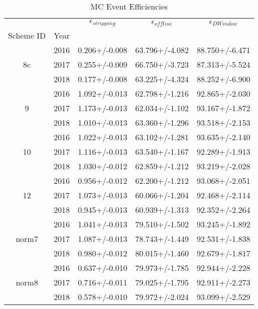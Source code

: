 \begin{table}
\centering
\caption{MC Event Efficiencies}
\label{tab:event_offdwin_2}
\begin{tabular}{ccccc}
\toprule
      &      & $\epsilon_{stripping}$ & $\epsilon_{offline}$ & $\epsilon_{D Window}$ \\
Scheme ID & Year &                        &                      &                       \\
\midrule
\multirow{3}{*}{8c} & 2016 &          0.206+/-0.008 &       63.796+/-4.082 &        88.750+/-6.471 \\
      & 2017 &          0.255+/-0.009 &       66.750+/-3.723 &        87.313+/-5.524 \\
      & 2018 &          0.177+/-0.008 &       63.225+/-4.324 &        88.252+/-6.900 \\
\cline{1-5}
\multirow{3}{*}{9} & 2016 &          1.092+/-0.013 &       62.798+/-1.216 &        92.865+/-2.030 \\
      & 2017 &          1.173+/-0.013 &       62.034+/-1.102 &        93.167+/-1.872 \\
      & 2018 &          1.010+/-0.013 &       63.360+/-1.296 &        93.518+/-2.153 \\
\cline{1-5}
\multirow{3}{*}{10} & 2016 &          1.022+/-0.013 &       63.102+/-1.281 &        93.635+/-2.140 \\
      & 2017 &          1.116+/-0.013 &       63.540+/-1.167 &        92.289+/-1.913 \\
      & 2018 &          1.030+/-0.012 &       62.859+/-1.212 &        93.219+/-2.028 \\
\cline{1-5}
\multirow{3}{*}{12} & 2016 &          0.956+/-0.012 &       62.200+/-1.212 &        93.068+/-2.051 \\
      & 2017 &          1.073+/-0.013 &       60.066+/-1.204 &        92.468+/-2.114 \\
      & 2018 &          0.945+/-0.013 &       60.939+/-1.313 &        92.352+/-2.264 \\
\cline{1-5}
\multirow{3}{*}{norm7} & 2016 &          1.041+/-0.013 &       79.510+/-1.502 &        93.245+/-1.892 \\
      & 2017 &          1.087+/-0.013 &       78.743+/-1.449 &        92.531+/-1.838 \\
      & 2018 &          0.980+/-0.012 &       80.015+/-1.460 &        92.679+/-1.817 \\
\cline{1-5}
\multirow{3}{*}{norm8} & 2016 &          0.637+/-0.010 &       79.973+/-1.785 &        92.944+/-2.228 \\
      & 2017 &          0.716+/-0.011 &       79.025+/-1.795 &        92.911+/-2.273 \\
      & 2018 &          0.578+/-0.010 &       79.972+/-2.024 &        93.099+/-2.529 \\
\bottomrule
\end{tabular}
\end{table}
